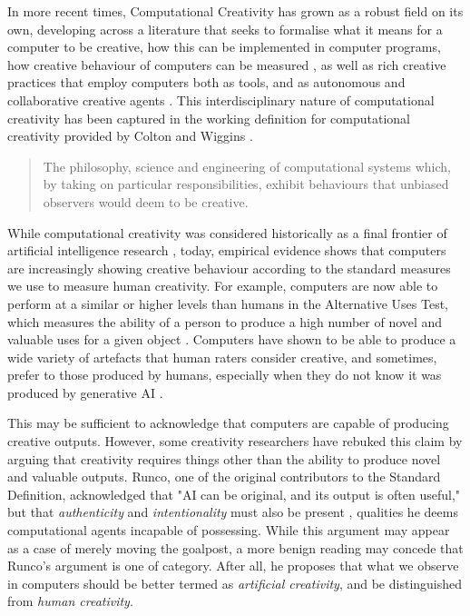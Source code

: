 In more recent times, Computational Creativity has grown as a robust field on its own, developing across a literature that seeks to formalise what it means for a computer to be creative, how this can be implemented in computer programs, how creative behaviour of computers can be measured \cite{Ritchie2007-jy, Colton2008-fh, Colton2011-uy, Maher2012-oj, Jordanous2012-kw}, as well as rich creative practices that employ computers both as tools, and as autonomous and collaborative creative agents \cite{Cohen1995-wt, Colton2015-qr, Perez-y-Perez1999-ma, Cope1992-pq, Reichardt1968-eo}. This interdisciplinary nature of computational creativity has been captured in the working definition for computational creativity provided by Colton and Wiggins \cite{Colton2021-bt}.

\begin{quote}
The philosophy, science and engineering of computational systems which, by taking on particular responsibilities, exhibit behaviours that unbiased observers would deem to be creative.
\end{quote}

While computational creativity was considered historically as a final frontier of artificial intelligence research \cite{Colton2021-bt}, today, empirical evidence shows that computers are increasingly showing creative behaviour according to the standard measures we use to measure human creativity. For example, computers are now able to perform at a similar or higher levels than humans in the Alternative Uses Test, which measures the ability of a person to produce a high number of novel and valuable uses for a given object \cite{Hubert2024-kv, Guzik2023-cl}. Computers have shown to be able to produce a wide variety of artefacts that human raters consider creative, and sometimes, prefer to those produced by humans, especially when they do not know it was produced by generative AI \cite{Alexander2024-pz, Wu2025-or, Kobis2021-bb}. 

This may be sufficient to acknowledge that computers are capable of producing creative outputs. However, some creativity researchers have rebuked this claim by arguing that creativity requires things other than the ability to produce novel and valuable outputs. Runco, one of the original contributors to the Standard Definition, acknowledged that "AI can be original, and its output is often useful," but that \emph{authenticity} and \emph{intentionality} must also be present \cite{Runco2025-bu}, qualities he deems computational agents incapable of possessing. While this argument may appear as a case of merely moving the goalpost, a more benign reading may concede that Runco's argument is one of category. After all, he proposes that what we observe in computers should be better termed as \textit{artificial creativity}, and be distinguished from \textit{human creativity}. 


